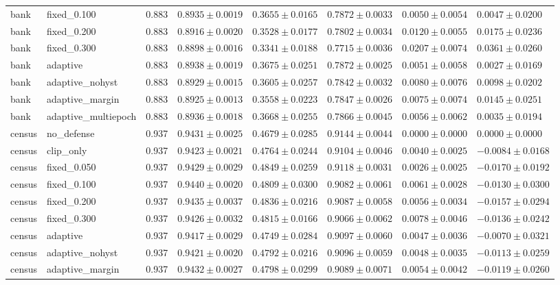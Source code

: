\begin{table}[!t]
{\begin{tabular}{llllllll}
bank & fixed\_0.100 & 0.883 & $0.8935\pm0.0019$ & $0.3655\pm0.0165$ & $0.7872\pm0.0033$ & $0.0050\pm0.0054$ & $0.0047\pm0.0200$ \\
bank & fixed\_0.200 & 0.883 & $0.8916\pm0.0020$ & $0.3528\pm0.0177$ & $0.7802\pm0.0034$ & $0.0120\pm0.0055$ & $0.0175\pm0.0236$ \\
bank & fixed\_0.300 & 0.883 & $0.8898\pm0.0016$ & $0.3341\pm0.0188$ & $0.7715\pm0.0036$ & $0.0207\pm0.0074$ & $0.0361\pm0.0260$ \\
bank & adaptive & 0.883 & $0.8938\pm0.0019$ & $0.3675\pm0.0251$ & $0.7872\pm0.0025$ & $0.0051\pm0.0058$ & $0.0027\pm0.0169$ \\
bank & adaptive\_nohyst & 0.883 & $0.8929\pm0.0015$ & $0.3605\pm0.0257$ & $0.7842\pm0.0032$ & $0.0080\pm0.0076$ & $0.0098\pm0.0202$ \\
bank & adaptive\_margin & 0.883 & $0.8925\pm0.0013$ & $0.3558\pm0.0223$ & $0.7847\pm0.0026$ & $0.0075\pm0.0074$ & $0.0145\pm0.0251$ \\
bank & adaptive\_multiepoch & 0.883 & $0.8936\pm0.0018$ & $0.3668\pm0.0255$ & $0.7866\pm0.0045$ & $0.0056\pm0.0062$ & $0.0035\pm0.0194$ \\
census & no\_defense & 0.937 & $0.9431\pm0.0025$ & $0.4679\pm0.0285$ & $0.9144\pm0.0044$ & $0.0000\pm0.0000$ & $0.0000\pm0.0000$ \\
census & clip\_only & 0.937 & $0.9423\pm0.0021$ & $0.4764\pm0.0244$ & $0.9104\pm0.0046$ & $0.0040\pm0.0025$ & $-0.0084\pm0.0168$ \\
census & fixed\_0.050 & 0.937 & $0.9429\pm0.0029$ & $0.4849\pm0.0259$ & $0.9118\pm0.0031$ & $0.0026\pm0.0025$ & $-0.0170\pm0.0192$ \\
census & fixed\_0.100 & 0.937 & $0.9440\pm0.0020$ & $0.4809\pm0.0300$ & $0.9082\pm0.0061$ & $0.0061\pm0.0028$ & $-0.0130\pm0.0300$ \\
census & fixed\_0.200 & 0.937 & $0.9435\pm0.0037$ & $0.4836\pm0.0216$ & $0.9087\pm0.0058$ & $0.0056\pm0.0034$ & $-0.0157\pm0.0294$ \\
census & fixed\_0.300 & 0.937 & $0.9426\pm0.0032$ & $0.4815\pm0.0166$ & $0.9066\pm0.0062$ & $0.0078\pm0.0046$ & $-0.0136\pm0.0242$ \\
census & adaptive & 0.937 & $0.9417\pm0.0029$ & $0.4749\pm0.0284$ & $0.9097\pm0.0060$ & $0.0047\pm0.0036$ & $-0.0070\pm0.0321$ \\
census & adaptive\_nohyst & 0.937 & $0.9421\pm0.0020$ & $0.4792\pm0.0216$ & $0.9096\pm0.0059$ & $0.0048\pm0.0035$ & $-0.0113\pm0.0259$ \\
census & adaptive\_margin & 0.937 & $0.9432\pm0.0027$ & $0.4798\pm0.0299$ & $0.9089\pm0.0071$ & $0.0054\pm0.0042$ & $-0.0119\pm0.0260$ \\

\end{tabular}}
\end{table}
